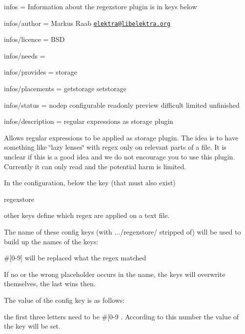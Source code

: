 
\begin{DoxyItemize}
\item infos = Information about the regexstore plugin is in keys below
\item infos/author = Markus Raab \href{mailto:elektra@libelektra.org}{\tt elektra@libelektra.\+org}
\item infos/licence = B\+SD
\item infos/needs =
\item infos/provides = storage
\item infos/placements = getstorage setstorage
\item infos/status = nodep configurable readonly preview difficult limited unfinished
\item infos/description = regular expressions as storage plugin
\end{DoxyItemize}

Allows regular expressions to be applied as storage plugin. The idea is to have something like \char`\"{}lazy lenses\char`\"{} with regex only on relevant parts of a file. It is unclear if this is a good idea and we do not encourage you to use this plugin. Currently it can only read and the potential harm is limited.

In the configuration, below the key (that must also exist) \begin{DoxyVerb}regexstore
\end{DoxyVerb}


other keys define which regex are applied on a text file.

The name of these config keys (with .../regexstore/ stripped of) will be used to build up the names of the keys\+:


\begin{DoxyItemize}
\item \#\mbox{[}0-\/9\mbox{]} will be replaced what the regex matched
\item If no or the wrong placeholder occurs in the name, the keys will overwrite themselves, the last wins then.
\end{DoxyItemize}

The value of the config key is as follows\+:


\begin{DoxyItemize}
\item the first three letters need to be \textquotesingle{}\#\mbox{[}0-\/9 \textquotesingle{}. According to this number the value of the key will be set.
\end{DoxyItemize}

